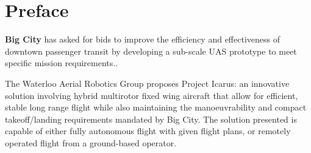 \section{Preface}
\label{sec:preface}

\textbf{Big City} has asked for bids to improve the efficiency and
effectiveness of downtown passenger transit by developing a sub-scale UAS
prototype to meet specific mission requirements..

The Waterloo Aerial Robotics Group proposes Project Icarus: an innovative solution
involving hybrid multirotor fixed wing aircraft that allow for efficient, stable long 
range flight while also maintaining the manoeuvrability and compact takeoff/landing 
requirements mandated by Big City. The solution presented is capable of either fully 
autonomous flight with given flight plans, or remotely operated flight from a 
ground-based operator.